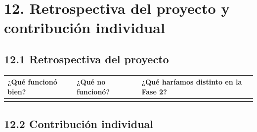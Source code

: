 \section{12. Retrospectiva del proyecto y contribución
individual}\label{retrospectiva-del-proyecto-y-contribuciuxf3n-individual}

\subsection{12.1 Retrospectiva del
proyecto}\label{retrospectiva-del-proyecto}

{\def\LTcaptype{none} %
\begin{longtable}[]{@{}
  >{\raggedright\arraybackslash}p{}
  >{\raggedright\arraybackslash}p{}
  >{\raggedright\arraybackslash}p{}@{}}
\toprule\noalign{}
\begin{minipage}[b]{\linewidth}\raggedright
\textbf{¿Qué funcionó bien?}
\end{minipage} & \begin{minipage}[b]{\linewidth}\raggedright
\textbf{¿Qué no funcionó?}
\end{minipage} & \begin{minipage}[b]{\linewidth}\raggedright
\textbf{¿Qué haríamos distinto en la Fase 2?}
\end{minipage} \\
\midrule\noalign{}
\endhead
\bottomrule\noalign{}
\endlastfoot
\pendiente{} & \pendiente{} & \pendiente{} \\
\end{longtable}
}

\subsection{12.2 Contribución
individual}\label{contribuciuxf3n-individual}


